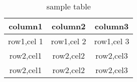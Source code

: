 \documentclass{article}
\begin{document}
	\begin{table}
		\centering
		\begin{tabular}{|c|c|c|}
			\hline
			\cellcolor{yellow}column1 & \cellcolor{blue}column2 & \cellcolor{orange}column3\\
			\hline
			\cellcolor{pink}row1,cel 1 & \cellcolor{yellow}row1,cel 2 & \cellcolor{blue}row1,cel 3\\
			\hline
				\cellcolor{green}row2,cel1 & \cellcolor{pink}row2,cel2 & \cellcolor{yellow}row2,cel3\\
					\cellcolor{red}row2,cel1 & \cellcolor{green}row2,cel2 & \cellcolor{pink}row2,cel3\\
					\hline
		\end{tabular}
		\caption{sample table}
		\label{fig:tab}
	\end{table}
\end{document}
